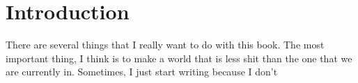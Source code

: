\chapter{Introduction}
\label{ch:int}

There are several things that I really want to do with this book.
The most important thing, I think is to make a world that is less shit than the
one that we are currently in.
Sometimes, I just start writing because I don't
